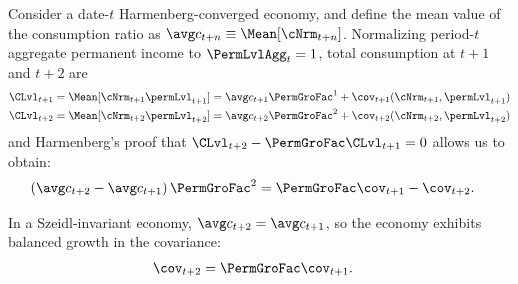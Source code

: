 \documentclass[\econtexRoot/BufferStockTheory]{subfiles}
\begin{document}
Consider a date-$t$ Harmenberg-converged economy, and define the mean value of the consumption ratio as $\cNrmAvg_{t+n} \equiv \Mean[\cNrm_{t+n}]$.
Normalizing period-$t$ aggregate permanent income to $\PermLvlAgg_{t}=1$, total consumption at $t+1$ and $t+2$ are
\begin{equation}\label{eq:atp2vsatp1}
  \begin{aligned}
    \CLvl_{t+1} & = \Mean[\cNrm_{t+1}\permLvl_{t+1}] = \cNrmAvg_{t+1}\PermGroFac^{1} + \cov_{t+1}(\cNrm_{t+1}, \permLvl_{t+1})
    \\  \CLvl_{t+2} & = \Mean[\cNrm_{t+2}\permLvl_{t+2}] = \cNrmAvg_{t+2}\PermGroFac^{2} + \cov_{t+2}(\cNrm_{t+2}, \permLvl_{t+2})
  \end{aligned}
\end{equation}
and Harmenberg's proof that $\CLvl_{t+2}-\PermGroFac \CLvl_{t+1}=0$ allows us to obtain:
\begin{equation} \label{eq:cNrmvsCov}\begin{aligned}
    \left(\cNrmAvg_{t+2} - \cNrmAvg_{t+1}\right)\PermGroFac^{2} & = \PermGroFac \cov_{t+1} - \cov_{t+2} .
  \end{aligned}\end{equation}

In a Szeidl-invariant economy, $\cNrmAvg_{t+2} = \cNrmAvg_{t+1}$, so the economy exhibits balanced growth in the covariance:
\begin{equation}\begin{gathered}\begin{aligned}
  \cov_{t+2} & = \PermGroFac \cov_{t+1}.
\end{aligned}\end{gathered}\end{equation}
\end{document}
